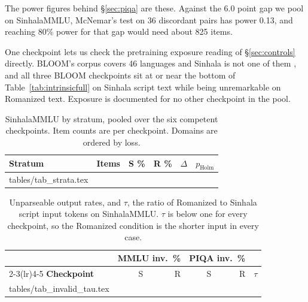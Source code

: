 \documentclass[11pt]{article}
\makeatletter
\newcommand{\rows}[1]{\@@input #1 }
\makeatother
\begin{document}
The power figures behind \S\ref{sec:piqa} are these. Against the 6.0 point gap we pool on
SinhalaMMLU, McNemar's test on 36 discordant pairs has power 0.13, and reaching 80\% power
for that gap would need about 825 items.

One checkpoint lets us check the pretraining exposure reading of
\S\ref{sec:controls} directly. BLOOM's corpus covers 46 languages and Sinhala is not
one of them \citep{laurencon-etal-2023-roots, lescao-etal-2023-bloom}, and all three
BLOOM checkpoints sit at or near the bottom of Table~\ref{tab:intrinsicfull} on
Sinhala script text while being unremarkable on Romanized text. Exposure is
documented for no other checkpoint in the pool.

\begin{table}[t]
\centering\small
\setlength{\tabcolsep}{4pt}
\begin{tabular}{@{}lrrrrr@{}}
\toprule
\textbf{Stratum} & \textbf{Items} & \textbf{S \%} & \textbf{R \%}
& \boldmath$\Delta$ & \boldmath$p_{\text{Holm}}$ \\
\midrule
\rows{tables/tab_strata.tex}
\bottomrule
\end{tabular}
\caption{SinhalaMMLU by stratum, pooled over the six competent checkpoints. Item
counts are per checkpoint. Domains are ordered by loss.}
\label{tab:strata}
\end{table}

\begin{table}[t]
\centering\small
\setlength{\tabcolsep}{2.2pt}
\begin{tabular}{@{}lrrrrr@{}}
\toprule
& \multicolumn{2}{c}{\textbf{MMLU inv.\ \%}} & \multicolumn{2}{c}{\textbf{PIQA inv.\ \%}} & \\
\cmidrule(lr){2-3}\cmidrule(lr){4-5}
\textbf{Checkpoint} & S & R & S & R & \boldmath$\tau$ \\
\midrule
\rows{tables/tab_invalid_tau.tex}
\bottomrule
\end{tabular}
\caption{Unparseable output rates, and $\tau$, the ratio of Romanized to
Sinhala script input tokens on SinhalaMMLU. $\tau$ is below one for every
checkpoint, so the Romanized condition is the shorter input in every case.}
\label{tab:invalidtau}
\end{table}
\end{document}

